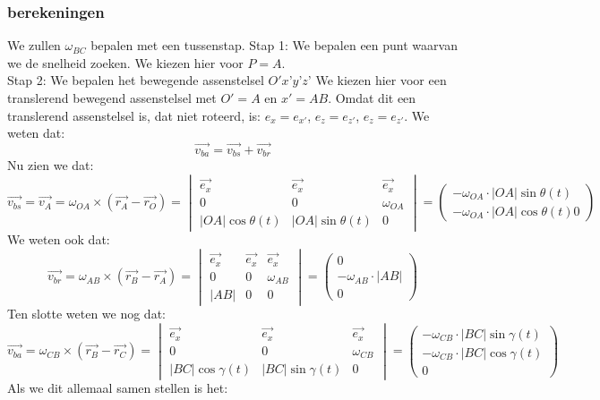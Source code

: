 \documentclass[10pt,a4paper]{article}
\begin{document}
\subsubsection*{berekeningen}
We zullen $\omega_{BC}$ bepalen met een tussenstap.
Stap 1: We bepalen een punt waarvan we de snelheid zoeken. We kiezen hier voor $P=A$.\\
Stap 2: We bepalen het bewegende assenstelsel $O'x’y’z’$ We kiezen hier voor een translerend bewegend assenstelsel met $O'=A$ en $x'=AB$. Omdat dit een translerend assenstelsel is, dat niet roteerd, is: $e_{x} = e_{x'}$, $e_{z} = e_{z'}$, $e_{z} = e_{z'}$.
We weten dat:
\[
\vec{v_{ba}} = \vec{v_{bs}} + \vec{v_{br}}
\]
Nu zien we dat:
\[
\vec{v_{bs}} = \vec{v_{A}} = \omega_{OA} \times (\vec{r_{A}} - \vec{r_{O}}) = 
\begin{vmatrix}
\vec{e_{x}} & \vec{e_{x}} & \vec{e_{x}}\\
0 & 0 & \omega_{OA}\\
|OA|\cos{\theta(t)} & |OA|\sin{\theta(t)} & 0
\end{vmatrix} 
=
\begin{pmatrix}
-\omega_{OA} \cdot |OA|\sin{\theta(t)}\\
-\omega_{OA} \cdot |OA|\cos{\theta(t)}
0
\end{pmatrix}
\]
We weten ook dat:
\[
\vec{v_{br}} = \omega_{AB} \times (\vec{r_{B}} - \vec{r_{A}}) = 
\begin{vmatrix}
\vec{e_{x}} & \vec{e_{x}} & \vec{e_{x}}\\
0 & 0 & \omega_{AB}\\
|AB| & 0 & 0
\end{vmatrix} 
=
\begin{pmatrix}
0\\
-\omega_{AB} \cdot |AB|\\
0
\end{pmatrix}
\]
Ten slotte weten we nog dat:
\[
\vec{v_{ba}} = \omega_{CB} \times (\vec{r_{B}} - \vec{r_{C}}) = 
\begin{vmatrix}
\vec{e_{x}} & \vec{e_{x}} & \vec{e_{x}}\\
0 & 0 & \omega_{CB}\\
|BC|\cos{\gamma(t)} & |BC|\sin{\gamma(t)} & 0
\end{vmatrix} 
=
\begin{pmatrix}
-\omega_{CB} \cdot |BC|\sin{\gamma(t)}\\
-\omega_{CB} \cdot |BC|\cos{\gamma(t)}\\
0
\end{pmatrix}
\]
Als we dit allemaal samen stellen is het:
\end{document}
